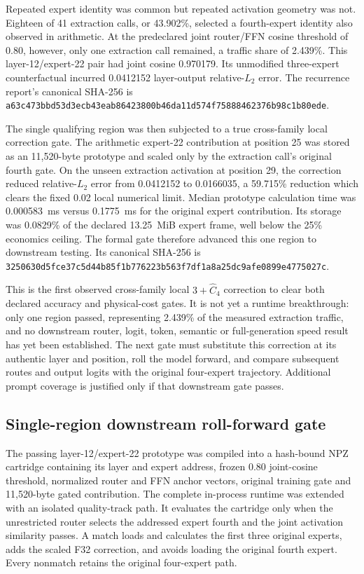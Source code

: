 Repeated expert identity was common but repeated activation geometry was not.
Eighteen of 41 extraction calls, or 43.902\%, selected a fourth-expert identity
also observed in arithmetic.  At the predeclared joint router/FFN cosine
threshold of 0.80, however, only one extraction call remained, a traffic share
of 2.439\%.  This layer-12/expert-22 pair had joint cosine 0.970179.  Its
unmodified three-expert counterfactual incurred 0.0412152 layer-output
relative-$L_2$ error.  The recurrence report's canonical SHA-256 is
\texttt{a63c473bbd53d3ecb43eab86423800b46da11d574f75888462376b98c1b80ede}.

The single qualifying region was then subjected to a true cross-family local
correction gate.  The arithmetic expert-22 contribution at position 25 was
stored as an 11,520-byte prototype and scaled only by the extraction call's
original fourth gate.  On the unseen extraction activation at position 29,
the correction reduced relative-$L_2$ error from 0.0412152 to 0.0166035, a
59.715\% reduction which clears the fixed 0.02 local numerical limit.  Median
prototype calculation time was 0.000583~ms versus 0.1775~ms for the original
expert contribution.  Its storage was 0.0829\% of the declared 13.25~MiB expert
frame, well below the 25\% economics ceiling.  The formal gate therefore
advanced this one region to downstream testing.  Its canonical SHA-256 is
\texttt{3250630d5fce37c5d44b85f1b776223b563f7df1a8a25dc9afe0899e4775027c}.

This is the first observed cross-family local $3+\widehat{C}_4$ correction to
clear both declared accuracy and physical-cost gates.  It is not yet a runtime
breakthrough: only one region passed, representing 2.439\% of the measured
extraction traffic, and no downstream router, logit, token, semantic or
full-generation speed result has yet been established.  The next gate must
substitute this correction at its authentic layer and position, roll the model
forward, and compare subsequent routes and output logits with the original
four-expert trajectory.  Additional prompt coverage is justified only if that
downstream gate passes.

\subsection{Single-region downstream roll-forward gate}

The passing layer-12/expert-22 prototype was compiled into a hash-bound NPZ
cartridge containing its layer and expert address, frozen 0.80 joint-cosine
threshold, normalized router and FFN anchor vectors, original training gate and
11,520-byte gated contribution.  The complete in-process runtime was extended
with an isolated quality-track path.  It evaluates the cartridge only when the
unrestricted router selects the addressed expert fourth and the joint activation
similarity passes.  A match loads and calculates the first three original
experts, adds the scaled F32 correction, and avoids loading the original fourth
expert.  Every nonmatch retains the original four-expert path.

